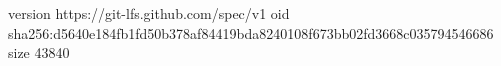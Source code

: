 version https://git-lfs.github.com/spec/v1
oid sha256:d5640e184fb1fd50b378af84419bda8240108f673bb02fd3668c035794546686
size 43840
